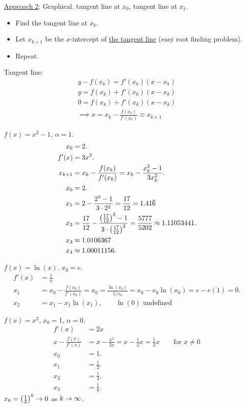 \documentclass[]{article}
\begin{document}
\ul{Approach 2}: Graphical. tangent line at $x_0$, tangent line at $x_1$.
\begin{itemize}
	\item Find the tangent line at $x_k$.
	\item Let $x_{k+1}$ be the $x$-intercept of \ul{the tangent line} (easy root finding problem).
	\item Repeat.
\end{itemize}
Tangent line:
\begin{align*}
	y - f(x_k) = f'(x_k)(x-x_k) \\
	y = f(x_k) + f'(x_k)(x-x_k) \\
	0 = f(x_k) + f'(x_k)(x-x_k) \\
	\implies x = x_k - \frac{f(x_k)}{f'(x_k)} \equiv x_{k+1}
\end{align*}
\begin{example}
	$f(x) = x^3-1$, $\alpha=1$.
	\begin{align*}
		x_0 &= 2. \\
		f'(x) &= 3x^2. \\
		x_{k+1} &= x_k - \frac{f(x_k)}{f'(x_k)} = x_k - \frac{x_k^3-1}{3x_k^2}. \\
		x_0 &= 2. \\
		x_1 &= 2-\frac{2^3-1}{3\cdot2^2} = \frac{17}{12} = 1.41\overline{6} \\
		x_2 &= \frac{17}{12} - \frac{\left(\frac{17}{12}\right)^3-1}{3\cdot\left(\frac{17}{12}\right)^2} = \frac{5777}{5202} \approx 1.11053441. \\
		x_3 &\approx 1.0106367 \\
		x_4 &\approx 1.00011156.
	\end{align*}
\end{example}
\begin{example}
	$f(x) = \ln(x)$. $x_0=e$.
	\begin{align*}
		f'(x) &= \frac1x \\
		x_1 &= x_0 - \frac{f(x_0)}{f'(x_0)} = x_0 = \frac{\ln(x_0)}{1/x_0} = x_0 - x_0\ln(x_0) = e-e(1)=0. \\
		x_2 &= x_1 - x_1\ln(x_1), \qquad \ln(0) \text{ undefined}
	\end{align*}
\end{example}
\begin{example}
	$f(x)=x^2$, $x_0=1$, $\alpha=0$.
	\begin{align*}
		f'(x) &= 2x \\
		x - \frac{f(x)}{f'(x)} &= x-\frac{x^2}{2x} = x-\frac12x=\frac12x \qquad \text{for }x\neq0 \\
		x_0 &= 1. \\
		x_1 &= \frac12. \\
		x_2 &= \frac14. \\
		x_3 &= \frac18.
	\end{align*}
	$x_k = \left(\frac12\right)^k\rightarrow0$ as $k\rightarrow\infty$.
\end{example}
\end{document}
